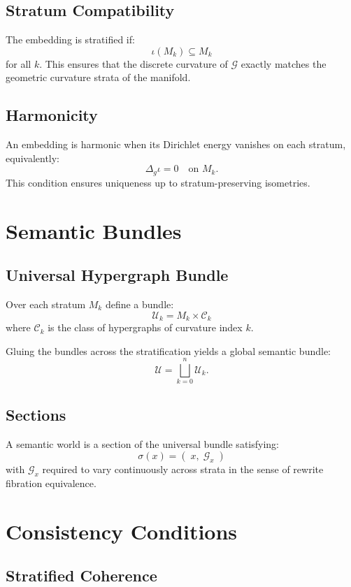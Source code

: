 \subsection{Stratum Compatibility}

The embedding is stratified if:
\[
\iota(M_k) \subseteq M_k
\]
for all $k$. This ensures that the discrete curvature of $\mathcal{G}$ exactly matches the geometric curvature strata of the manifold.

\subsection{Harmonicity}

An embedding is harmonic when its Dirichlet energy vanishes on each stratum, equivalently:
\[
\Delta_g \iota = 0
\quad\text{on } M_k.
\]
This condition ensures uniqueness up to stratum-preserving isometries.

\section{Semantic Bundles}

\subsection{Universal Hypergraph Bundle}

Over each stratum $M_k$ define a bundle:
\[
\mathcal{U}_k = M_k \times \mathcal{C}_k
\]
where $\mathcal{C}_k$ is the class of hypergraphs of curvature index $k$.

Gluing the bundles across the stratification yields a global semantic bundle:
\[
\mathcal{U} = \bigsqcup_{k=0}^n \mathcal{U}_k.
\]

\subsection{Sections}

A semantic world is a section of the universal bundle satisfying:
\[
\sigma(x) = (\; x,\; \mathcal{G}_x \;)
\]
with $\mathcal{G}_x$ required to vary continuously across strata in the sense of rewrite fibration equivalence.

\section{Consistency Conditions}

\subsection{Stratified Coherence}

